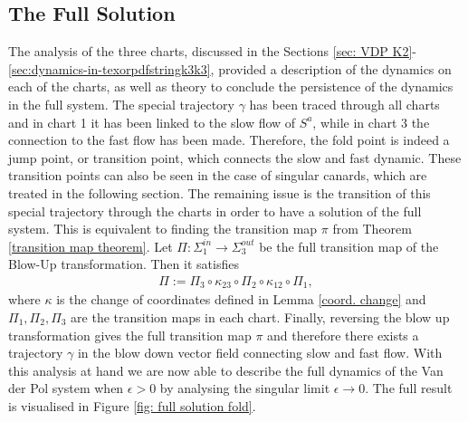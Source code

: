 \subsection{The Full Solution}
The analysis of the three charts, discussed in the Sections \ref{sec: VDP K2}-\ref{sec:dynamics-in-texorpdfstringk3k3}, provided a description of the dynamics on each of the charts, as well as theory to conclude the persistence of the dynamics in the full system.
The special trajectory $\gamma$ has been traced through all charts and in chart 1 it has been linked to the slow flow of $S^a$, while in chart 3 the connection to the fast flow has been made. Therefore, the fold point is indeed a jump point, or transition point, which connects the slow and fast dynamic.
These transition points can also be seen in the case of singular canards, which are treated in the following section.
The remaining issue is the transition of this special trajectory through the charts in order to have a solution of the full system. 
This is equivalent to finding the transition map $\pi$ from Theorem \ref{transition map theorem}.
Let $\Pi: \Sigma^{in}_1 \to \Sigma^{out}_3$ be the full transition map of the Blow-Up transformation. Then it satisfies
\begin{align*}
\Pi := \Pi_3 \circ \kappa_{23} \circ \Pi_2 \circ \kappa_{12} \circ \Pi_1,
\end{align*}
where $\kappa$ is the change of coordinates defined in Lemma \ref{coord. change} and $\Pi_1, \Pi_2, \Pi_3$ are the transition maps in each chart.
Finally, reversing the blow up transformation gives the full transition map $\pi$ and therefore there exists a trajectory $\gamma$ in the blow down vector field connecting slow and fast flow.
With this analysis at hand we are now able to describe the full dynamics of the Van der Pol system when $\epsilon>0$ by analysing the singular limit $\epsilon \to 0$. The full result is visualised in Figure \ref{fig: full solution fold}.
